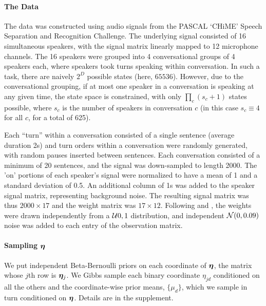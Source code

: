 \paragraph{The Data} The data was constructed using audio signals from
the PASCAL ‘CHiME’ Speech Separation and Recognition Challenge.  The
underlying signal consisted of 16 simultaneous speakers, with the
signal matrix linearly mapped to 12 microphone channels.
The 16 speakers were grouped into 4
conversational groups of 4 speakers each, where speakers took 
turns speaking within conversation.   In such a task, there are naively $2^{D}$ possible
states (here, $65536$).  However, due to the conversational grouping, if
at most one speaker in a conversation is speaking at any given
time, the state space is constrained, with only $\prod_c (s_c + 1)$
states possible, where $s_c$ is the number of speakers in conversation
$c$ (in this case $s_c \equiv 4$ for all $c$, for a total of 625).

Each ``turn'' within a conversation consisted of a single sentence
(average duration 2s) and turn orders within a conversation were
randomly generated, with random pauses inserted between sentences.
Each conversation consisted of a minimum of 20 sentences, and the
signal was down-sampled to length 2000.  The 'on' portions of each
speaker's signal were normalized to have a mean of 1 and a standard
deviation of 0.5.  An additional column of 
1s was added to the speaker signal matrix,
representing background noise.  The resulting signal matrix was thus
$2000 \times 17$ and the weight matrix was $17 \times 12$.  Following
\citet{gael2009infinite} and \citet{valera2015infinite}, the weights
were drawn independently from a $\mathcal{U}{0,1}$ distribution, and
independent $\mathcal{N}(0,0.09)$ noise was added to each entry of the
observation matrix.

\paragraph{Sampling $\boldsymbol{\eta}$} We put independent Beta-Bernoulli priors
on each coordinate of $\boldsymbol{\eta}$, the matrix whose $j$th row is
$\boldsymbol{\eta}_j$.  We Gibbs sample each binary coordinate $\eta_{jd}$
conditioned on all the others and the coordinate-wise prior means,
$\{\mu_d\}$, which we sample in turn conditioned on $\boldsymbol{\eta}$.
Details are in the supplement.

